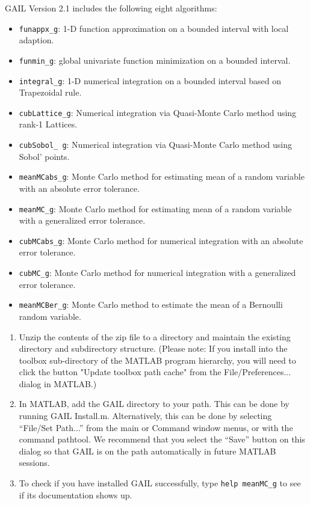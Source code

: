 \documentclass{iitthesis}
\theoremstyle{definition}
\begin{document}
GAIL Version 2.1 \cite{GAIL_2_1} includes the following eight algorithms:
\begin{itemize}
\item {\tt funappx\_g}: 1-D function approximation on a bounded interval with local adaption.
\item {\tt funmin\_g}: global univariate function minimization on a bounded interval.
\item {\tt integral\_g}: 1-D numerical integration on a bounded interval based on Trapezoidal rule.
\item {\tt cubLattice\_g}: Numerical integration via Quasi-Monte Carlo method using rank-1 Lattices.
\item {\tt cubSobol\_ g}: Numerical integration via Quasi-Monte Carlo method using Sobol’ points.
\item {\tt meanMCabs\_g}: Monte Carlo method for estimating mean of a random variable with an absolute error tolerance.
\item {\tt meanMC\_g}: Monte Carlo method for estimating mean of a random variable with a generalized error tolerance.
\item {\tt cubMCabs\_g}: Monte Carlo method for numerical integration with an absolute error tolerance.
\item {\tt cubMC\_g}: Monte Carlo method for numerical integration with a generalized error tolerance.
\item  {\tt meanMCBer\_g}: Monte Carlo method to estimate the mean of a Bernoulli random variable.
\end{itemize}

\begin{enumerate}
\item Unzip the contents of the zip file to a directory and maintain the existing directory and subdirectory structure. (Please note: If you install into the toolbox sub-directory of the MATLAB program hierarchy, you will need to click the button "Update toolbox path cache" from the File/Preferences... dialog in MATLAB.)
\item In MATLAB, add the GAIL directory to your path. This can be done by running GAIL Install.m. Alternatively, this can be done by selecting “File/Set Path...” from the main or Command window menus, or with the command pathtool. We recommend that you select the “Save” button on this dialog so that GAIL is on the path automatically in future MATLAB sessions.
\item To check if you have installed GAIL successfully, type {\tt help meanMC\_g} to see if its documentation shows up.
\end{enumerate}
\end{document}
